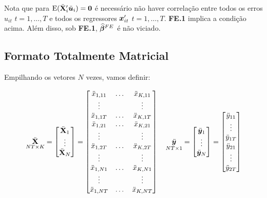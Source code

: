 \documentclass[11pt, oneside, a4paper, article]{article}
\numberwithin{equation}{section}
\begin{document}
\noindent
Nota que para $\text{E}(\ddot{\mathbf{X}}_{i}' \ddot{\boldsymbol{u}}_{i}) = \boldsymbol{0}$ é necessário não haver correlação entre todos os erros 
$u_{it}$ $t=1, \dots, T$
e todos os regressores
$\boldsymbol{x}_{it}'$ $t=1, \dots, T$.
\textbf{FE.1} implica a condição acima.
Além disso, sob \textbf{FE.1}, $\widehat{\boldsymbol{\beta}}^{FE}$ é não viciado.

\subsection*{Formato Totalmente Matricial}

Empilhando os vetores $N$ vezes, vamos definir:

\vspace{-1 em}
\begin{align*}
\underset{NT \times K}{\ddot{\mathbf{X}}} = 
\begin{bmatrix}
\ddot{\mathbf{X}}_{1} \\ \vdots \\ \ddot{\mathbf{X}}_{N}
\end{bmatrix}
=
\begin{bmatrix}
	\ddot{x}_{1,11} & \dots & \ddot{x}_{K, 11} \\
	\vdots          &       &  \vdots          \\
	\ddot{x}_{1,1T} & \dots & \ddot{x}_{K, 1T} \\
	\ddot{x}_{1,21} & \dots & \ddot{x}_{K, 21} \\
	\vdots          &       &  \vdots          \\
	\ddot{x}_{1,2T} & \dots & \ddot{x}_{K, 2T} \\
	\vdots          &       &  \vdots          \\
	\ddot{x}_{1,N1} & \dots & \ddot{x}_{K, N1} \\
	\vdots          &       &  \vdots          \\
	\ddot{x}_{1,NT} & \dots & \ddot{x}_{K, NT}
\end{bmatrix}
\quad
\underset{NT \times 1}{\ddot{\boldsymbol{y}}} = 
\begin{bmatrix}
\ddot{\boldsymbol{y}}_{1} \\ \vdots \\ \ddot{\boldsymbol{y}}_{N}
\end{bmatrix}
=
\begin{bmatrix}
	\ddot{y}_{11} \\ \vdots \\ \ddot{y}_{1T} \\
	\ddot{y}_{21} \\ \vdots \\ \ddot{y}_{2T} \\

\end{bmatrix}
\end{align*}
\end{document}
